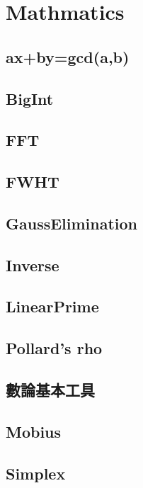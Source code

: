 \section{Mathmatics}

\subsection{ax+by=gcd(a,b)}

\subsection{BigInt}

\subsection{FFT}

\subsection{FWHT}

\subsection{GaussElimination}

\subsection{Inverse}

\subsection{LinearPrime}

\subsection{Pollard's rho}

\subsection{數論基本工具}

\subsection{Mobius}

\subsection{Simplex}

